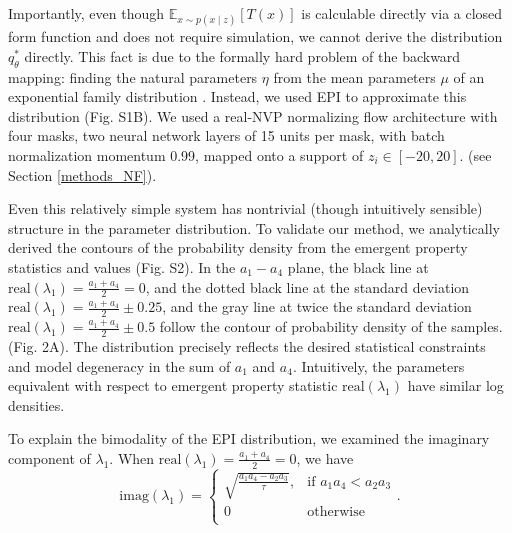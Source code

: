 \documentclass[11pt]{article}
\begin{document}
Importantly, even though $\mathbb{E}_{x\sim p(x \mid z)}\left[T(x)\right]$ is calculable directly via a closed form function and does not require simulation, we cannot derive the distribution $q^*_\theta$ directly.  This fact is due to the formally hard problem of the backward mapping: finding the natural parameters $\eta$ from the mean parameters $\mu$ of an exponential family distribution \cite{wainwright2008graphical}.  Instead, we used EPI to approximate this distribution (Fig. S1B). We used a real-NVP normalizing flow architecture with four masks, two neural network layers of 15 units per mask, with batch normalization momentum 0.99, mapped onto a support of $z_i \in \left[-20, 20 \right]$. (see Section \ref{methods_NF}).

Even this relatively simple system has nontrivial (though intuitively sensible) structure in the parameter distribution.  To validate our method, we analytically derived the contours of the probability density from the emergent property statistics and values (Fig. S2).  In the $a_1-a_4$ plane, the black line at $\text{real}(\lambda_1) = \frac{a_1 + a_4}{2} = 0$, and the dotted black line at
the standard deviation $\text{real}(\lambda_1) = \frac{a_1 + a_4}{2} \pm 0.25$, and the gray line at twice the standard deviation
$\text{real}(\lambda_1) = \frac{a_1 + a_4}{2} \pm 0.5$ follow the contour of probability density of the samples. (Fig. 2A). The distribution precisely reflects the desired statistical constraints and model degeneracy in the sum of $a_1$ and $a_4$.
 Intuitively, the parameters equivalent with respect to emergent property statistic $\text{real}(\lambda_1)$ have similar log densities.

To explain the bimodality of the EPI distribution, we examined the imaginary component of $\lambda_1$.  When $\text{real}(\lambda_1) = \frac{a_1 + a_4}{2} = 0$, we have
\begin{equation}
\text{imag}(\lambda_1) = \begin{cases}
                             \sqrt{\frac{a_1 a_4 - a_2 a_3}{\tau}},  & \text{if } a_1 a_4 < a_2 a_3 \\
                             0 & \text{otherwise } \\
                         \end{cases}.
\end{equation}
\end{document}

